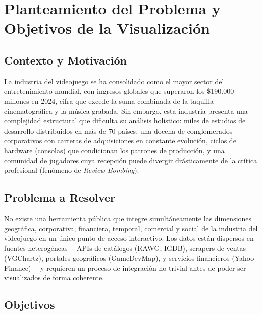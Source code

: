 \documentclass[11pt,a4paper]{article}
\begin{document}
\tableofcontents
\newpage

\section{Planteamiento del Problema y Objetivos de la Visualización}

\subsection{Contexto y Motivación}

La industria del videojuego se ha consolidado como el mayor sector del entretenimiento mundial, con ingresos globales que superaron los \$190.000 millones en 2024, cifra que excede la suma combinada de la taquilla cinematográfica y la música grabada. Sin embargo, esta industria presenta una complejidad estructural que dificulta su análisis holístico: miles de estudios de desarrollo distribuidos en más de 70 países, una docena de conglomerados corporativos con carteras de adquisiciones en constante evolución, ciclos de hardware (consolas) que condicionan los patrones de producción, y una comunidad de jugadores cuya recepción puede divergir drásticamente de la crítica profesional (fenómeno de \textit{Review Bombing}).

\subsection{Problema a Resolver}

No existe una herramienta pública que integre simultáneamente las dimensiones geográfica, corporativa, financiera, temporal, comercial y social de la industria del videojuego en un único punto de acceso interactivo. Los datos están dispersos en fuentes heterogéneas ---APIs de catálogos (RAWG, IGDB), scrapers de ventas (VGChartz), portales geográficos (GameDevMap), y servicios financieros (Yahoo Finance)--- y requieren un proceso de integración no trivial antes de poder ser visualizados de forma coherente.

\subsection{Objetivos}
\end{document}
